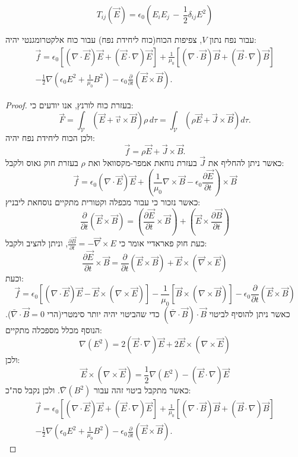 \documentclass{tstextbook}
\begin{document}
\begin{definition}
$$T_{i j}({\vec E})=\epsilon_{0}(E_{i}E_{j}\,-\,{\textstyle{\frac{1}{2}}}\delta_{i j}E^{2})$$

\end{definition}
\begin{proposition}
עבור נפח נתון \(V\), צפיפות הכוח(כוח ליחידת נפח) עבור כוח אלקטרומגנטי יהיה:
$$\begin{array}{c}{{\displaystyle{\vec{f}=\epsilon_{0}\left[(\nabla\cdot\vec{E})\vec{E}+(\vec{E}\cdot\nabla)\vec{E}\right]+\frac{1}{\mu_{0}}\left[(\nabla\cdot\vec{B})\vec{B}+(\vec{B}\cdot\nabla)\vec{B}\right]}}}\\ {{\displaystyle{-\frac{1}{2}\nabla\left(\epsilon_{0}E^{2}+\frac{1}{\mu_{0}}B^{2}\right)-\epsilon_{0}\frac{\partial}{\partial t}(\vec{E}\times\vec{B}).}}}\end{array}$$

\end{proposition}
\begin{proof}
בעזרת כוח לורנץ, אנו יודעים כי:
$$\vec{F}=\int_{\mathcal{V}}(\vec{E}+\vec{v}\times\vec{B})\rho\,d\tau=\int_{\mathcal{V}}\left(\rho\vec{E}+\vec{J}\times\vec{B}\right)d\tau.$$
ולכן הכוח ליחידת נפח יהיה:
$$\vec{f}=\rho\vec{E}+\vec{J}\times\vec{B}.$$
כאשר ניתן להחליף את \(\vec{J}\) בעזרת נוחאת אמפר-מקסוואל ואת \(\rho\) בעזרת חוק גאוס ולקבל:
$$\vec{f}=\epsilon_{0}(\nabla\cdot\vec{E})\vec{E}+\left({\frac{1}{\mu_{0}}}\nabla\times\vec{B}-\epsilon_{0}{\frac{\partial\vec{E}}{\partial t}}\right)\times\vec{B}$$
כאשר נזכור כי עבור מכפלה וקטורית מתקיים נוסחאת ליבניץ:
$${\frac{\partial}{\partial t}}(\vec{E}\times\vec{B})=\left({\frac{\partial\vec{E}}{\partial t}}\times\vec{B}\right)+\left(\vec{E}\times{\frac{\partial\vec{B}}{\partial t}}\right)$$
כעת חוק פאראדיי אומר כי \({\frac{\partial{\vec B}}{\partial t}}=-{\vec\nabla\times E}\), וניתן להציב ולקבל:
$${\frac{\partial{\vec E}}{\partial t}}\times{\vec B}={\frac{\partial}{\partial t}}({\vec E}\times{\vec B})+{\vec E}\times({\vec\nabla}\times{\vec E})$$
וכעת:
$$\vec{f}=\epsilon_{0}\left[(\nabla\cdot\vec{E})\vec{E}-\vec{E}\times(\nabla\times\vec{E})\right]-{\frac{1}{\mu_{0}}}\left[\vec{B}\times(\nabla\times\vec{B})\right]-\epsilon_{0}{\frac{\partial}{\partial t}}(\vec{E}\times\vec{B})$$
כאשר ניתן להוסיף לביטוי \(\left( \bar{\nabla} \cdot \vec{B} \right)\cdot \vec{B}\) כדי שהביטוי יהיה יותר סימטרי(הרי \(\bar{\nabla} \cdot \vec{B}=0\)). הנוסף מכלל מספכלה מתקיים:
$$\nabla(E^{2})=2(\vec{E}\cdot\nabla)\vec{E}+2\vec{E}\times(\nabla\times\vec{E})$$
ולכן:
$$\vec{E}\times(\nabla\times\vec{E})={\frac{1}{2}}\nabla(E^{2})-(\vec{E}\cdot\nabla)\vec{E}$$
כאשר מתקבל ביטוי זהה עבור \(\bar{\nabla}(B^{2})\). ולכן נקבל סה"כ:
$$\begin{array}{c}{{\displaystyle{\vec{f}=\epsilon_{0}\left[(\nabla\cdot\vec{E})\vec{E}+(\vec{E}\cdot\nabla)\vec{E}\right]+\frac{1}{\mu_{0}}\left[(\nabla\cdot\vec{B})\vec{B}+(\vec{B}\cdot\nabla)\vec{B}\right]}}}\\ {{\displaystyle{-\frac{1}{2}\nabla\left(\epsilon_{0}E^{2}+\frac{1}{\mu_{0}}B^{2}\right)-\epsilon_{0}\frac{\partial}{\partial t}(\vec{E}\times\vec{B}).}}}\end{array}$$

\end{proof}
\end{document}
